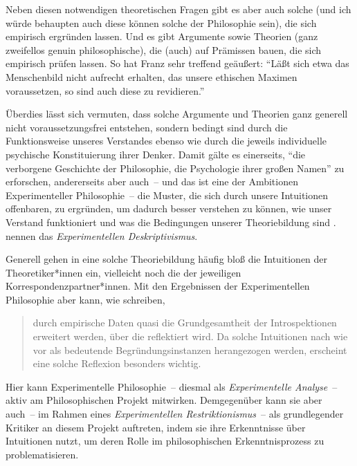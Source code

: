 \documentclass[justified,nobib,nohyper,symmetric,twoside]{tufte-book}
\begin{document}
Neben diesen notwendigen theoretischen Fragen gibt es aber auch solche (und ich würde behaupten auch diese können solche der Philosophie sein), die sich empirisch ergründen lassen.
Und es gibt Argumente sowie Theorien (ganz zweifellos genuin philosophische), die (auch) auf Prämissen bauen, die sich empirisch prüfen lassen.
So hat Franz \citet[S.~670]{kutschera_empirische_1988} sehr treffend geäußert: \enquote{Läßt sich etwa das Menschenbild nicht aufrecht erhalten, das unsere ethischen Maximen voraussetzen, so sind auch diese zu revidieren.}

Überdies lässt sich vermuten, dass solche Argumente und Theorien ganz generell nicht voraussetzungsfrei entstehen, sondern bedingt sind durch die Funktionsweise unseres Verstandes ebenso wie durch die jeweils individuelle psychische Konstituierung ihrer Denker.
Damit gälte es einerseits, \enquote{die verborgene Geschichte der Philosophie, die Psychologie ihrer großen Namen} \citep[S.~259]{nietzsche_ecce_2017} zu erforschen, andererseits aber auch~-- und das ist eine der Ambitionen Experimenteller Philosophie~-- die Muster, die sich durch unsere Intuitionen offenbaren, zu ergründen, um dadurch besser verstehen zu können, wie unser Verstand funktioniert und was die Bedingungen unserer Theoriebildung sind \citep[S.~12]{knobe_experimental_2008}. \citet{nadelhoffer_past_2007} nennen das \textit{Experimentellen Deskriptivismus}.

Generell gehen in eine solche Theoriebildung häufig bloß die Intuitionen der Theoretiker*innen ein, vielleicht noch die der jeweiligen Korrespondenzpartner*innen.
Mit den Ergebnissen der Experimentellen Philosophie aber kann, wie \citet[S.~21]{bauer_zwei_2019} schreiben,

\begin{quote}
   durch empirische Daten quasi die Grundgesamtheit der Introspektionen erweitert werden, über die reflektiert wird. Da solche Intuitionen nach wie vor als bedeutende Begründungsinstanzen herangezogen werden, erscheint eine solche Reflexion besonders wichtig.
\end{quote}

\noindent Hier kann Experimentelle Philosophie~-- diesmal als \textit{Experimentelle Analyse}~-- aktiv am Philosophischen Projekt mitwirken. Demgegenüber kann sie aber auch~-- im Rahmen eines \textit{Experimentellen Restriktionismus}~-- als grundlegender Kritiker an diesem Projekt auftreten, indem sie ihre Erkenntnisse über Intuitionen nutzt, um deren Rolle im philosophischen Erkenntnisprozess zu problematisieren.
\end{document}
